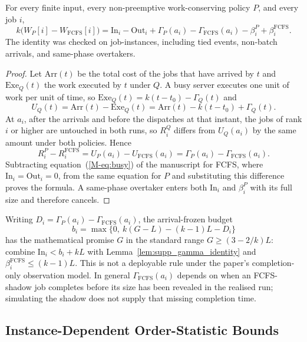 \begin{lemma}
\label{lem:supp_gamma_identity}
For every finite input, every non-preemptive work-conserving policy $P$, and
every job $i$,
\[
 k\bigl(W_P[i]-W_{\mathrm{FCFS}}[i]\bigr)
 =\mathrm{In}_i-\mathrm{Out}_i
  +\Gamma_P(a_i)-\Gamma_{\mathrm{FCFS}}(a_i)
  -\beta^P_i+\beta^{\mathrm{FCFS}}_i.
\]
The identity was checked on  job-instances, including tied
events, non-batch arrivals, and same-phase overtakers.
\end{lemma}

\begin{proof}
Let $\mathrm{Arr}(t)$ be the total cost of the jobs that have arrived by $t$ and
$\mathrm{Exe}_Q(t)$ the work executed by $t$ under $Q$. A busy server executes one unit of
work per unit of time, so $\mathrm{Exe}_Q(t) = k(t-t_0)-\Gamma_Q(t)$ and
\[
 U_Q(t)=\mathrm{Arr}(t)-\mathrm{Exe}_Q(t)
       =\mathrm{Arr}(t)-k(t-t_0)+\Gamma_Q(t).
\]
At $a_i$, after the arrivals and before the dispatches at that instant, the jobs of
rank $i$ or higher are untouched in both runs, so $R^Q_i$ differs from $U_Q(a_i)$ by the
same amount under both policies. Hence
\[
 R_i^P-R_i^{\mathrm{FCFS}}
 =U_P(a_i)-U_{\mathrm{FCFS}}(a_i)
 =\Gamma_P(a_i)-\Gamma_{\mathrm{FCFS}}(a_i).
\]
Subtracting equation~(\ref*{M-eq:busy}) of the manuscript for FCFS, where
$\mathrm{In}_i=\mathrm{Out}_i=0$, from the same equation for $P$ and substituting this
difference proves the formula. A same-phase overtaker enters both
$\mathrm{In}_i$ and $\beta^P_i$ with its full size and therefore cancels.
\end{proof}

Writing $D_i=\Gamma_P(a_i)-\Gamma_{\mathrm{FCFS}}(a_i)$, the arrival-frozen
budget
\[
 b_i=\max\{0,\ k(G-L)-(k-1)L-D_i\}
\]
has the mathematical promise $G$ in the standard range
$G\geq(3-2/k)L$: combine
$\mathrm{In}_i<b_i+kL$ with Lemma~\ref{lem:supp_gamma_identity} and
$\beta^{\mathrm{FCFS}}_i\leq(k-1)L$. This is not a deployable rule under the
paper's completion-only observation model. In general
$\Gamma_{\mathrm{FCFS}}(a_i)$ depends on when an FCFS-shadow job completes
before its size has been revealed in the realised run; simulating the shadow
does not supply that missing completion time.

\subsection{Instance-Dependent Order-Statistic Bounds}

